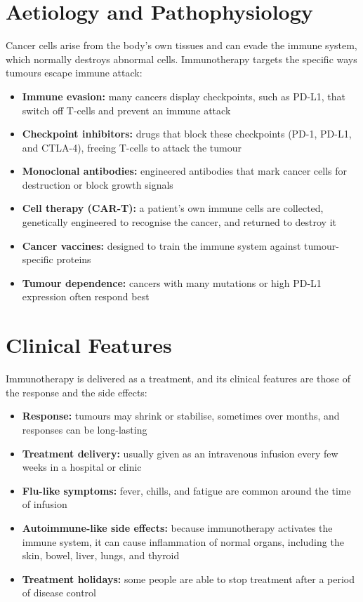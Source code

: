 \section*{Aetiology and Pathophysiology}
Cancer cells arise from the body's own tissues and can evade the immune system, which normally destroys abnormal cells. Immunotherapy targets the specific ways tumours escape immune attack:
\begin{itemize}
    \item \textbf{Immune evasion:} many cancers display checkpoints, such as PD-L1, that switch off T-cells and prevent an immune attack
    \item \textbf{Checkpoint inhibitors:} drugs that block these checkpoints (PD-1, PD-L1, and CTLA-4), freeing T-cells to attack the tumour
    \item \textbf{Monoclonal antibodies:} engineered antibodies that mark cancer cells for destruction or block growth signals
    \item \textbf{Cell therapy (CAR-T):} a patient's own immune cells are collected, genetically engineered to recognise the cancer, and returned to destroy it
    \item \textbf{Cancer vaccines:} designed to train the immune system against tumour-specific proteins
    \item \textbf{Tumour dependence:} cancers with many mutations or high PD-L1 expression often respond best
\end{itemize}

\section*{Clinical Features}
Immunotherapy is delivered as a treatment, and its clinical features are those of the response and the side effects:
\begin{itemize}
    \item \textbf{Response:} tumours may shrink or stabilise, sometimes over months, and responses can be long-lasting
    \item \textbf{Treatment delivery:} usually given as an intravenous infusion every few weeks in a hospital or clinic
    \item \textbf{Flu-like symptoms:} fever, chills, and fatigue are common around the time of infusion
    \item \textbf{Autoimmune-like side effects:} because immunotherapy activates the immune system, it can cause inflammation of normal organs, including the skin, bowel, liver, lungs, and thyroid
    \item \textbf{Treatment holidays:} some people are able to stop treatment after a period of disease control
\end{itemize}

